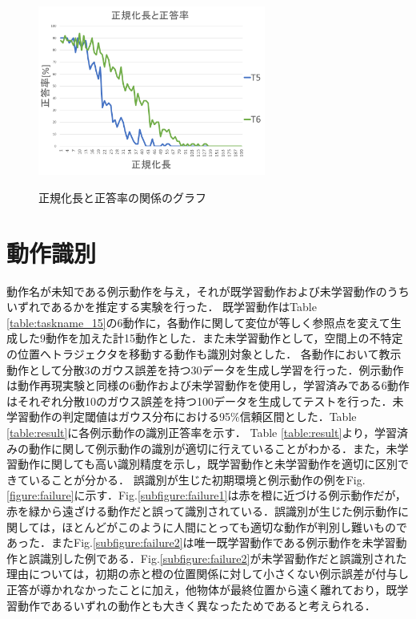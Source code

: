 \begin{figure}[h]
\begin{minipage}[t]{.49\textwidth}
		\label{subfigure:unit_c}
	\end{minipage}
	\begin{minipage}[t]{.49\textwidth}
		\centering
		\includegraphics[width=7.5cm]{chart11_d.png} \\ %
		\label{subfigure:unit_d}
	\end{minipage}
	\caption{正規化長と正答率の関係のグラフ}
	\label{figure:success_rate_for_UNIT}
\end{figure}


\section{動作識別}

動作名が未知である例示動作を与え，それが既学習動作および未学習動作のうちいずれであるかを推定する実験を行った．
既学習動作はTable \ref{table:taskname_15}の6動作に，各動作に関して変位が等しく参照点を変えて生成した9動作を加えた計15動作とした．また未学習動作として，空間上の不特定の位置へトラジェクタを移動する動作も識別対象とした．
各動作において教示動作として分散3のガウス誤差を持つ30データを生成し学習を行った．例示動作は動作再現実験と同様の6動作および未学習動作を使用し，学習済みである6動作はそれぞれ分散10のガウス誤差を持つ100データを生成してテストを行った．未学習動作の判定閾値はガウス分布における95\%信頼区間とした．Table \ref{table:result}に各例示動作の識別正答率を示す．
Table \ref{table:result}より，学習済みの動作に関して例示動作の識別が適切に行えていることがわかる．また，未学習動作に関しても高い識別精度を示し，既学習動作と未学習動作を適切に区別できていることが分かる．
誤識別が生じた初期環境と例示動作の例をFig.\ref{figure:failure}に示す．Fig.\ref{subfigure:failure1}は赤を橙に近づける例示動作だが，赤を緑から遠ざける動作だと誤って識別されている．誤識別が生じた例示動作に関しては，ほとんどがこのように人間にとっても適切な動作が判別し難いものであった．またFig.\ref{subfigure:failure2}は唯一既学習動作である例示動作を未学習動作と誤識別した例である．Fig.\ref{subfigure:failure2}が未学習動作だと誤識別された理由については，初期の赤と橙の位置関係に対して小さくない例示誤差が付与し正答が導かれなかったことに加え，他物体が最終位置から遠く離れており，既学習動作であるいずれの動作とも大きく異なったためであると考えられる．

